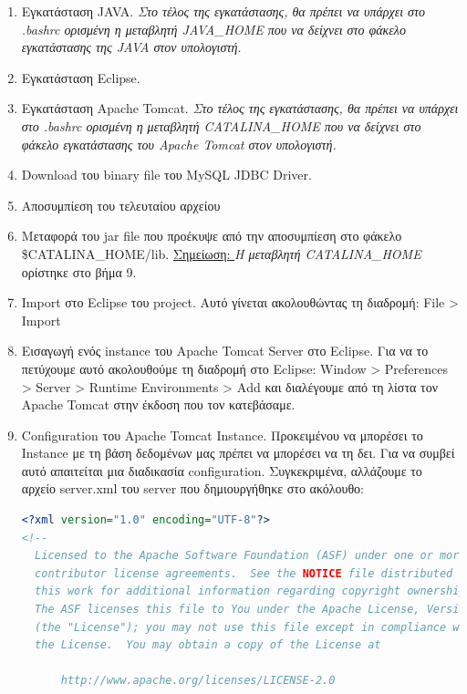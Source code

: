 \documentclass[a4paper,oneside, 11pt]{article}
\begin{document}
\begin{enumerate}
\item Εγκατάσταση JAVA. \bigbreak 
\textit{Στο τέλος της εγκατάστασης, θα πρέπει να υπάρχει στο .bashrc ορισμένη η μεταβλητή JAVA\_HOME που να δείχνει στο φάκελο εγκατάστασης της JAVA στον υπολογιστή.}
\item Εγκατάσταση Eclipse.
\item Εγκατάσταση Apache Tomcat. \bigbreak 
\textit{Στο τέλος της εγκατάστασης, θα πρέπει να υπάρχει στο .bashrc ορισμένη η μεταβλητή CATALINA\_HOME που να δείχνει στο φάκελο εγκατάστασης του Apache Tomcat στον υπολογιστή.}
\item Download του binary file του MySQL JDBC Driver.
\item Αποσυμπίεση του τελευταίου αρχείου
\item Μεταφορά του jar file που προέκυψε από την αποσυμπίεση στο φάκελο \$CATALINA\_HOME/lib. \bigbreak
\underline{Σημείωση: } \textit{Η μεταβλητή CATALINA\_HOME} ορίστηκε στο βήμα 9.
\item Import στο Eclipse του project. Αυτό γίνεται ακολουθώντας τη διαδρομή: File > Import
\item Εισαγωγή ενός instance του Apache Tomcat Server στο Eclipse. \bigbreak 
Για να το πετύχουμε αυτό ακολουθούμε τη διαδρομή στο Eclipse: 
Window > Preferences > Server > Runtime Environments > Αdd και διαλέγουμε από τη λίστα τον Apache Tomcat στην έκδοση που τον κατεβάσαμε.
\item Configuration του Apache Tomcat Instance. \bigbreak
Προκειμένου να μπορέσει το Instance με τη βάση δεδομένων μας πρέπει να μπορέσει να τη δει. Για να συμβεί αυτό απαιτείται μια διαδικασία configuration. Συγκεκριμένα, αλλάζουμε το αρχείο server.xml του server που δημιουργήθηκε στο ακόλουθο:
\begin{lstlisting}[language=XML]
<?xml version="1.0" encoding="UTF-8"?>
<!--
  Licensed to the Apache Software Foundation (ASF) under one or more
  contributor license agreements.  See the NOTICE file distributed with
  this work for additional information regarding copyright ownership.
  The ASF licenses this file to You under the Apache License, Version 2.0
  (the "License"); you may not use this file except in compliance with
  the License.  You may obtain a copy of the License at

      http://www.apache.org/licenses/LICENSE-2.0


\end{lstlisting}
\end{enumerate}
\end{document}
